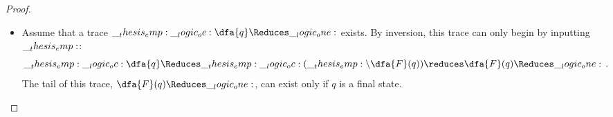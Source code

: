 \begin{proof}
\begin{enumerate}[parsep=0em, listparindent=\parindent]
\begin{itemize}
    \item
      Assume that a trace $\emp \oc \dfa{q} \Reduces \one$ exists.
      By inversion, this trace can only begin by inputting $\__thesis_emp:$:
      \begin{equation*}
        \emp \oc \dfa{q} \Reduces \emp \oc (\emp \limp \dfa{F}(q)) \reduces \dfa{F}(q) \Reduces \one
      \,.
      \end{equation*}
      The tail of this trace, $\dfa{F}(q) \Reduces \one$, can exist only if $q$ is a final state.
    \qedhere
    \end{itemize}



  \end{enumerate}
\end{proof}


